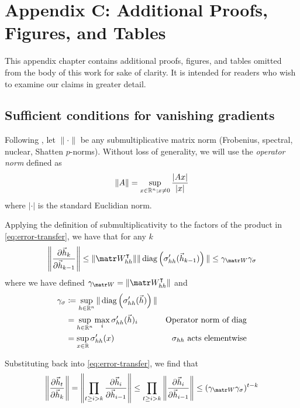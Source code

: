 \chapter{Appendix C: Additional Proofs, Figures, and Tables}

\ifpdf
    \graphicspath{{Appendix3/Figs/Raster/}{Appendix3/Figs/PDF/}{Appendix3/Figs/}}
\else
    \graphicspath{{Appendix3/Figs/Vector/}{Appendix3/Figs/}}
\fi

This appendix chapter contains additional proofs, figures, and tables omitted
from the body of this work for sake of clarity. It is intended for readers who
wish to examine our claims in greater detail.

\section{Sufficient conditions for vanishing gradients}\label{sec:vanishing-exploding-gradients}

Following \citet{Pascanu2012}, let $\| \cdot \|$ be any
submultiplicative matrix norm (\eg Frobenius, spectral, nuclear, Shatten
$p$-norms). Without loss of generality, we will use the \emph{operator norm}
defined as
\begin{equation}\label{eq:operator-norm}
    \| A \| = \sup_{x \in \mathbb{R}^n; x \neq 0} \frac{|A x|}{|x|}
\end{equation}
where $|\cdot|$ is the standard Euclidian norm.

Applying the definition of submultiplicativity to the factors of
the product in \cref{eq:error-transfer}, we have that for any $k$
\begin{equation}
    \left\| \frac{\pd \h_k}{\pd \h_{k-1}} \right\|
    \leq \| \W_{hh}^\tp \| \| \diag\left( \sigma_{hh}'(\h_{k-1}) \right) \|
    \leq \gamma_{\W} \gamma_\sigma
\end{equation}
where we have defined $\gamma_{\W} = \| \W_{hh}^\tp \|$ and
\begin{align}
    \gamma_\sigma
    &\coloneqq \sup_{h \in \mathbb{R}^n} \| \operatorname*{diag} \left( \sigma_{hh}'(\vec{h}) \right) \|  &\\
    &= \sup_{h \in \mathbb{R}^n} \max_i \sigma_{hh}'(\vec{h})_i &\mbox{Operator norm of diag} \\
    &= \sup_{x \in \mathbb{R}} \sigma_{hh}'(x) &\mbox{$\sigma_{hh}$ acts elementwise}
\end{align}

Substituting back into \cref{eq:error-transfer}, we find that
\begin{equation}
    \left\| \frac{\pd \h_t}{\pd \h_k} \right\|
    = \left\| \prod_{t \geq i > k} \frac{\pd \h_i}{\pd \h_{i-1}} \right\|
    \leq  \prod_{t \geq i > k} \left\| \frac{\pd \h_i}{\pd \h_{i-1}} \right\|
    \leq (\gamma_{\W} \gamma_\sigma)^{t-k}
\end{equation}

